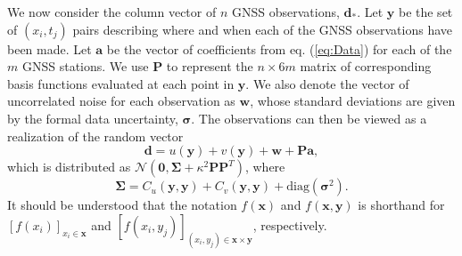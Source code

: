 \documentclass[10pt,letter]{article}
\begin{document}
We now consider the column vector of $n$ GNSS observations, $\bm{d}_*$. Let $\bm{y}$ be the set of $(x_i, t_j)$ pairs describing where and when each of the GNSS observations have been made. Let $\bm{a}$ be the vector of coefficients from eq. (\ref{eq:Data}) for each of the $m$ GNSS stations. We use $\bm{P}$ to represent the $n \times 6m$ matrix of corresponding basis functions evaluated at each point in $\bm{y}$. We  also denote the vector of uncorrelated noise for each observation as $\bm{w}$, whose standard deviations are given by the formal data uncertainty, $\bm{\sigma}$. The observations can then be viewed as a realization of the random vector
\begin{equation}
\bm{d} = u(\bm{y}) + v(\bm{y}) + \bm{w} + \bm{P}\bm{a},
\end{equation}
which is distributed as $\mathcal{N}(\bm{0},\bm{\Sigma} + \kappa^2\bm{P}\bm{P}^T)$, where
\begin{equation}\label{eq:Cd}
\bm{\Sigma} = C_u(\bm{y},\bm{y}) + C_v(\bm{y},\bm{y}) + 
              \mathrm{diag}\left(\bm{\sigma}^2\right).  
\end{equation}
It should be understood that the notation $f(\bm{x})$ and $f(\bm{x},\bm{y})$ is shorthand for $[f(x_i)]_{x_i \in \bm{x}}$ and $[f(x_i,y_j)]_{(x_i,y_j) \in \bm{x} \times \bm{y}}$, respectively. 
\end{document}
